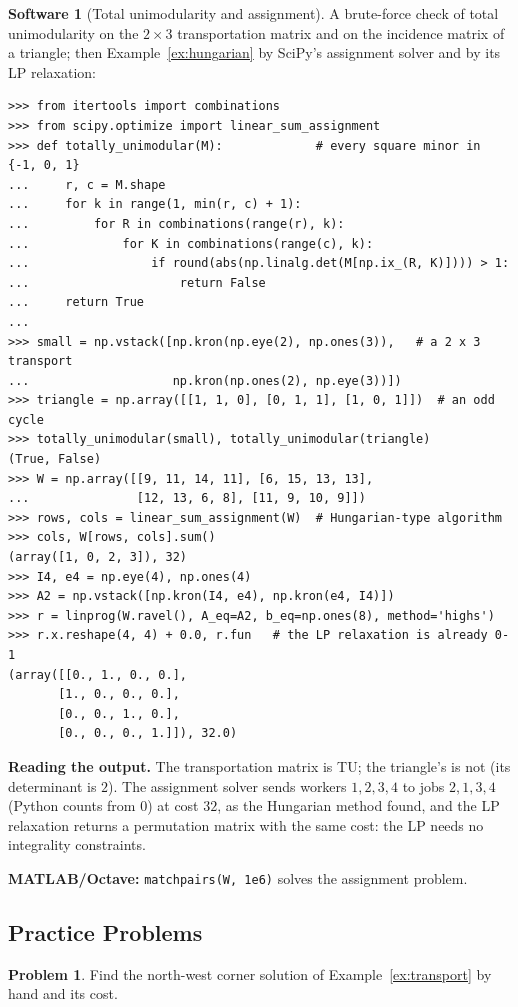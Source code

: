 \documentclass[11pt,a4paper]{article}
\numberwithin{equation}{section}
\theoremstyle{definition}
\newtheorem{software}[thm]{Software}
\newtheorem{problemx}{Problem}[subsection]
\newenvironment{problem}{\begin{problemx}}{\end{problemx}}
\begin{document}
\begin{software}[Total unimodularity and assignment]
\label{sw:assignment}
A brute-force check of total unimodularity on the $2 \times 3$ transportation matrix and on the incidence matrix of a triangle; then Example~\ref{ex:hungarian} by SciPy's assignment solver and by its LP relaxation:
{\small\begin{verbatim}
>>> from itertools import combinations
>>> from scipy.optimize import linear_sum_assignment
>>> def totally_unimodular(M):             # every square minor in {-1, 0, 1}
...     r, c = M.shape
...     for k in range(1, min(r, c) + 1):
...         for R in combinations(range(r), k):
...             for K in combinations(range(c), k):
...                 if round(abs(np.linalg.det(M[np.ix_(R, K)]))) > 1:
...                     return False
...     return True
...
>>> small = np.vstack([np.kron(np.eye(2), np.ones(3)),   # a 2 x 3 transport
...                    np.kron(np.ones(2), np.eye(3))])
>>> triangle = np.array([[1, 1, 0], [0, 1, 1], [1, 0, 1]])  # an odd cycle
>>> totally_unimodular(small), totally_unimodular(triangle)
(True, False)
>>> W = np.array([[9, 11, 14, 11], [6, 15, 13, 13],
...               [12, 13, 6, 8], [11, 9, 10, 9]])
>>> rows, cols = linear_sum_assignment(W)  # Hungarian-type algorithm
>>> cols, W[rows, cols].sum()
(array([1, 0, 2, 3]), 32)
>>> I4, e4 = np.eye(4), np.ones(4)
>>> A2 = np.vstack([np.kron(I4, e4), np.kron(e4, I4)])
>>> r = linprog(W.ravel(), A_eq=A2, b_eq=np.ones(8), method='highs')
>>> r.x.reshape(4, 4) + 0.0, r.fun   # the LP relaxation is already 0-1
(array([[0., 1., 0., 0.],
       [1., 0., 0., 0.],
       [0., 0., 1., 0.],
       [0., 0., 0., 1.]]), 32.0)
\end{verbatim}}
\textbf{Reading the output.} The transportation matrix is TU; the triangle's is not (its determinant is $2$). The assignment solver sends workers $1, 2, 3, 4$ to jobs $2, 1, 3, 4$ (Python counts from $0$) at cost $32$, as the Hungarian method found, and the LP relaxation returns a permutation matrix with the same cost: the LP
needs no integrality constraints.

\textbf{MATLAB/Octave:} \texttt{matchpairs(W, 1e6)} solves the assignment problem.
\end{software}

\subsection{Practice Problems}

\begin{problem}
Find the north-west corner solution of Example~\ref{ex:transport} by hand and its cost.
\end{problem}
\end{document}
